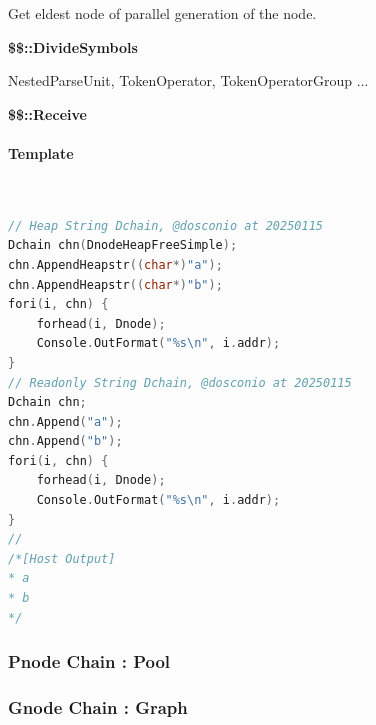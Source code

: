 Get eldest node of parallel generation of the node.

\textbf{\$\$::DivideSymbols}

NestedParseUnit, TokenOperator, TokenOperatorGroup ...

\textbf{\$\$::Receive}



\paragraph{Template} \

\begin{lstlisting}[language=C++]
// Heap String Dchain, @dosconio at 20250115
Dchain chn(DnodeHeapFreeSimple);
chn.AppendHeapstr((char*)"a");
chn.AppendHeapstr((char*)"b");
fori(i, chn) {
	forhead(i, Dnode);
	Console.OutFormat("%s\n", i.addr);
}
// Readonly String Dchain, @dosconio at 20250115
Dchain chn;
chn.Append("a");
chn.Append("b");
fori(i, chn) {
	forhead(i, Dnode);
	Console.OutFormat("%s\n", i.addr);
}
//
/*[Host Output]
* a
* b
*/
\end{lstlisting}



\subsubsection{Pnode Chain : Pool}



\subsubsection{Gnode Chain : Graph}

